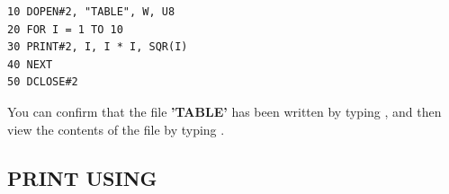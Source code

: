 \begin{description}[leftmargin=2cm,style=nextline]
\begin{tcolorbox}[colback=black,coltext=white]
\verbatimfont{\codefont}
\begin{verbatim}
10 DOPEN#2, "TABLE", W, U8
20 FOR I = 1 TO 10
30 PRINT#2, I, I * I, SQR(I)
40 NEXT
50 DCLOSE#2
\end{verbatim}
\end{tcolorbox}

                  You can confirm that the file {\bf 'TABLE'} has been written by typing , and then view the contents of the file by typing .

\end{description}


\newpage
\subsection{PRINT USING}
